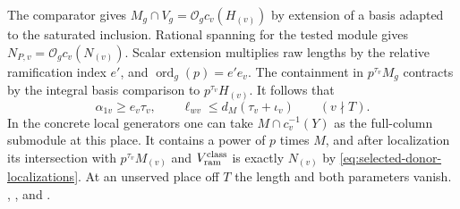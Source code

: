 The comparator gives \(M_g\cap V_g=\mathcal O_g c_v(H_{(v)})\)
by extension of a basis adapted to the saturated inclusion.
Rational spanning for the tested module gives
\(N_{P,v}=\mathcal O_g c_v(N_{(v)})\).
Scalar extension multiplies raw lengths by the relative
ramification index \(e'\), and \(\operatorname{ord}_g(p)=e'e_v\).
The containment in \(p^{\tau_v}M_g\) contracts by the integral
basis comparison to \(p^{\tau_v}H_{(v)}\). It follows that
\begin{equation}
\label{eq:selected-donor-off-level-index}
 \alpha_{1v}\ge e_v\tau_v,\qquad
 \ell_{wv}\le d_M(\tau_v+\iota_v)\qquad(v\nmid T).
\end{equation}
In the concrete local generators one can take
\(M\cap c_v^{-1}(Y)\) as the full-column submodule at this place.
It contains a power of \(p\) times \(M\), and after localization
its intersection with \(p^{\tau_v}M_{(v)}\) and
\(V_{\rm ram}^{\rm class}\) is exactly \(N_{(v)}\) by
\eqref{eq:selected-donor-localizations}. At an unserved place
off \(T\) the length and both parameters vanish.
,
,
 and
.

